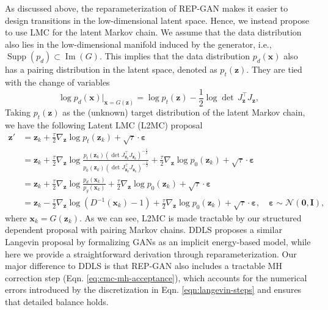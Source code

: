 \documentclass[runningheads]{llncs}
\newcommand{\bx}{\mathbf{x}}
\newcommand{\bz}{\mathbf{z}}
\newcommand{\bI}{\mathbf{I}}
\newcommand{\bvarepsilon}{\bm{\varepsilon}}
\newcommand{\cN}{\mathcal{N}}
\newcommand{\bzero}{\mathbf{0}}
\newcommand{\<}{\left\langle}
\renewcommand{\>}{\right\rangle}
\begin{document}
As discussed above, the reparameterization of REP-GAN makes it easier to design transitions in the low-dimensional latent space. Hence, we instead propose to use LMC for the latent Markov chain.
We assume that the data distribution also lies in the low-dimensional manifold induced by the generator, i.e., 
$\operatorname{Supp}\left(p_d\right)\subset\operatorname{Im}(G)$. This implies that the data distribution $p_d(\bx)$ also has a pairing distribution in the latent space, denoted as $p_t(\bz)$. They are tied with the change of variables
\begin{equation}
\log p_d(\bx)\rvert_{\bx=G(\bz)}=\log p_t(\bz) - \frac{1}{2} \log\det\, J_{\bz}^\top J_{\bz},
\end{equation}
Taking $p_t(\bz)$ as the (unknown) target distribution of the latent Markov chain, we have the following Latent LMC (L2MC) proposal 
\begin{equation}
\begin{aligned}
\bz'&=\bz_k+\frac{\tau}{2}\nabla_{\bz}\log p_t(\bz_k)+\sqrt{\tau}\cdot\bvarepsilon\\
&=\bz_k+\frac{\tau}{2}\nabla_{\bz}\log\frac{p_t(\bz_k)
\left(\det J_{\bz_k}^\top J_{\bz_k}\right)^{-\frac{1}{2}}
}{p_0(\bz_k)
\left(\det J_{\bz_k}^\top J_{\bz_k}\right)^{-\frac{1}{2}}
}+\frac{\tau}{2}\nabla_{\bz}\log p_0(\bz_k)+\sqrt{\tau}\cdot\bvarepsilon\\
&=\bz_k+\frac{\tau}{2}\nabla_{\bz}\log\frac{p_d(\bx_k)}{p_g(\bx_k)}+\frac{\tau}{2}\nabla_{\bz}\log p_0(\bz_k)+\sqrt{\tau}\cdot\bvarepsilon\\
&=\bz_k-\frac{\tau}{2}\nabla_{\bz}\log(D^{-1}(\bx_k)-1)+\frac{\tau}{2}\nabla_{\bz}\log p_0(\bz_k)+\sqrt{\tau}\cdot\bvarepsilon, \quad\bvarepsilon\sim\cN(\bzero,\bI),
\end{aligned}
\label{eq:langevin}
\end{equation}
where $\bx_k=G(\bz_k)$. As we can see, L2MC is made tractable by our structured dependent proposal with pairing Markov chains. DDLS \cite{che2020your} proposes a similar Langevin proposal by formalizing GANs as an implicit energy-based model, while here we provide a straightforward derivation through reparameterization. Our major difference to DDLS is that REP-GAN also includes a tractable MH correction step (Eqn. \eqref{eq:cmc-mh-acceptance}), which accounts for the numerical errors introduced by the discretization in Eqn. \eqref{eqn:langevin-steps} and ensures that detailed balance holds. 
\end{document}
